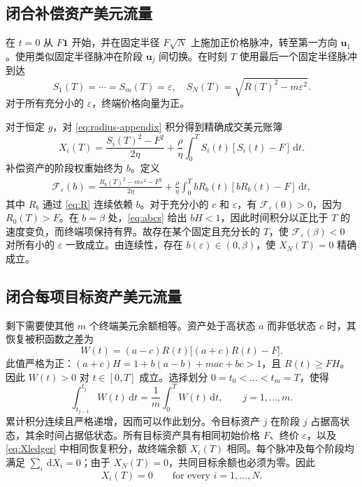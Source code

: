 \documentclass[11pt]{article}
\numberwithin{equation}{section}
\theoremstyle{definition}
\theoremstyle{remark}
\newcommand{\dd}{\,\mathrm{d}}
\newcommand{\one}{\mathbf{1}}
\begin{document}
\subsection{闭合补偿资产美元流量}
在 $t=0$ 从 $F\one$ 开始，并在固定半径 $F\sqrt N$ 上施加正价格脉冲，转至第一方向 $\bm u_1$。使用类似固定半径脉冲在阶段 $\bm u_j$ 间切换。在时刻 $T$ 使用最后一个固定半径脉冲到达
\begin{equation}\label{eq:endpoint-severe}
S_1(T)=\cdots=S_m(T)=\varepsilon,
\quad S_N(T)=\sqrt{R(T)^2-m\varepsilon^2}.
\end{equation}
对于所有充分小的 $\varepsilon$，终端价格向量为正。

对于恒定 $g$，对 \eqref{eq:radius-appendix} 积分得到精确成交美元账簿
\begin{equation}\label{eq:Xledger}
X_i(T)=\frac{S_i(T)^2-F^2}{2\eta}
+\frac\rho\eta\int_0^T S_i(t)[S_i(t)-F]\dd t.
\end{equation}
补偿资产的阶段权重始终为 $b$。定义
\begin{align}\label{eq:compensator}
\mathcal F_\varepsilon(b)=\frac{R_b(T)^2-m\varepsilon^2-F^2}{2\eta}
+\frac\rho\eta\int_0^T bR_b(t)[bR_b(t)-F]\dd t,
\end{align}
其中 $R_b$ 通过 \eqref{eq:R} 连续依赖 $b$。对于充分小的 $c$ 和 $\varepsilon$，有 $\mathcal F_\varepsilon(0)>0$，因为 $R_0(T)>F$。在 $b=\beta$ 处，\eqref{eq:abcs} 给出 $bH<1$，因此时间积分以正比于 $T$ 的速度变负，而终端项保持有界。故存在某个固定且充分长的 $T$，使 $\mathcal F_\varepsilon(\beta)<0$ 对所有小的 $\varepsilon$ 一致成立。由连续性，存在 $b(\varepsilon)\in(0,\beta)$，使 $X_N(T)=0$ 精确成立。

\subsection{闭合每项目标资产美元流量}
剩下需要使其他 $m$ 个终端美元余额相等。资产处于高状态 $a$ 而非低状态 $c$ 时，其恢复被积函数之差为
\begin{equation}\label{eq:W}
W(t)=(a-c)R(t)\big[(a+c)R(t)-F\big].
\end{equation}
此值严格为正：$(a+c)H=1+b(a-b)+mac+bc>1$，且 $R(t)\ge FH$。因此 $W(t)>0$ 对 $t\in[0,T]$ 成立。选择划分 $0=t_0<\dots<t_m=T$，使得
\begin{equation}\label{eq:weights}
\int_{t_{j-1}}^{t_j}W(t)\dd t=\frac1m\int_0^T W(t)\dd t,
\qquad j=1,\ldots,m.
\end{equation}
累计积分连续且严格递增，因而可以作此划分。令目标资产 $j$ 在阶段 $j$ 占据高状态，其余时间占据低状态。所有目标资产具有相同初始价格 $F$、终价 $\varepsilon$，以及 \eqref{eq:Xledger} 中相同恢复积分，故终端余额 $X_i(T)$ 相同。每个脉冲及每个阶段均满足 $\sum_i\dd X_i=0$；由于 $X_N(T)=0$，共同目标余额也必须为零。因此
\begin{equation}\label{eq:allclosed}
X_i(T)=0\qquad\text{for every } i=1,\ldots,N.
\end{equation}
\end{document}
